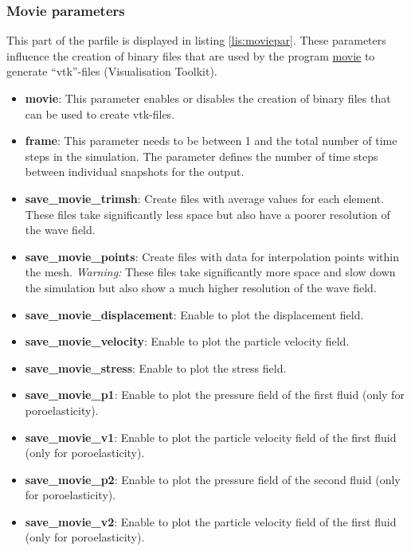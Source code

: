     	\subsubsection{Movie parameters}
    	\label{subsubsec:moviepar}
			This part of the parfile is displayed in listing \ref{lis:moviepar}. These parameters influence the creation of binary files that are used by the program \url{movie} to generate ``vtk''-files (Visualisation Toolkit).
			
    		\begin{itemize}
    			\item \textbf{movie}: This parameter enables or disables the creation of binary files that can be used to create vtk-files.
    			\item \textbf{frame}: This parameter needs to be between 1 and the total number of time steps in the simulation. The parameter defines the number of time steps between individual snapshots for the output.
    			\item \textbf{save\_movie\_trimsh}: Create files with average values for each element. These files take significantly less space but also have a poorer resolution of the wave field.
    			\item \textbf{save\_movie\_points}: Create files with data for interpolation points within the mesh. \textit{Warning:} These files take significantly more space and slow down the simulation but also show a much higher resolution of the wave field.
    			\item \textbf{save\_movie\_displacement}: Enable to plot the displacement field.
    			\item \textbf{save\_movie\_velocity}: Enable to plot the particle velocity field.
    			\item \textbf{save\_movie\_stress}: Enable to plot the stress field.
    			\item \textbf{save\_movie\_p1}: Enable to plot the pressure field of the first fluid (only for poroelasticity).
    			\item \textbf{save\_movie\_v1}: Enable to plot the particle velocity field of the first fluid (only for poroelasticity).
    			\item \textbf{save\_movie\_p2}: Enable to plot the pressure field of the second fluid (only for poroelasticity).
    			\item \textbf{save\_movie\_v2}: Enable to plot the particle velocity field of the first fluid (only for poroelasticity).
    		\end{itemize}
